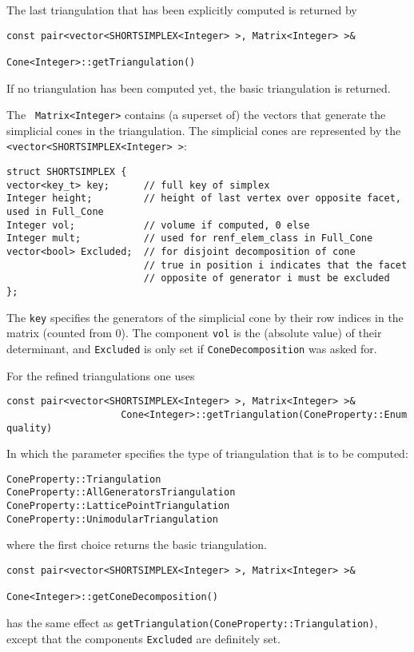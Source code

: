 \begin{small}
The last triangulation that has been explicitly computed is returned by
\begin{Verbatim}
const pair<vector<SHORTSIMPLEX<Integer> >, Matrix<Integer> >&
                                                Cone<Integer>::getTriangulation()
\end{Verbatim}
If no triangulation has been computed yet, the basic triangulation is returned.

The \verb| Matrix<Integer>| contains (a superset of) the vectors that generate the simplicial cones in the triangulation. The simplicial cones are represented by the \verb|<vector<SHORTSIMPLEX<Integer> >|:
\begin{Verbatim}
struct SHORTSIMPLEX {
vector<key_t> key;      // full key of simplex
Integer height;         // height of last vertex over opposite facet, used in Full_Cone
Integer vol;            // volume if computed, 0 else
Integer mult;           // used for renf_elem_class in Full_Cone
vector<bool> Excluded;  // for disjoint decomposition of cone
                        // true in position i indicates that the facet
                        // opposite of generator i must be excluded
};
\end{Verbatim}
The \verb|key| specifies the generators of the simplicial cone by their row indices in the matrix (counted from $0$). The component \verb|vol| is the (absolute value) of their determinant, and \verb|Excluded| is only set if \verb|ConeDecomposition| was asked for.

For the refined triangulations one uses
\begin{Verbatim}
const pair<vector<SHORTSIMPLEX<Integer> >, Matrix<Integer> >& 
                    Cone<Integer>::getTriangulation(ConeProperty::Enum quality)
\end{Verbatim}
In which the parameter specifies the type of triangulation that is to be computed:
\begin{Verbatim}
ConeProperty::Triangulation
ConeProperty::AllGeneratorsTriangulation
ConeProperty::LatticePointTriangulation
ConeProperty::UnimodularTriangulation
\end{Verbatim}
where the first choice returns the basic triangulation.

\begin{Verbatim}
const pair<vector<SHORTSIMPLEX<Integer> >, Matrix<Integer> >&
                                           Cone<Integer>::getConeDecomposition()
\end{Verbatim}
has the same effect as \verb|getTriangulation(ConeProperty::Triangulation)|, except that the components \verb|Excluded| are definitely set.


\end{small}
